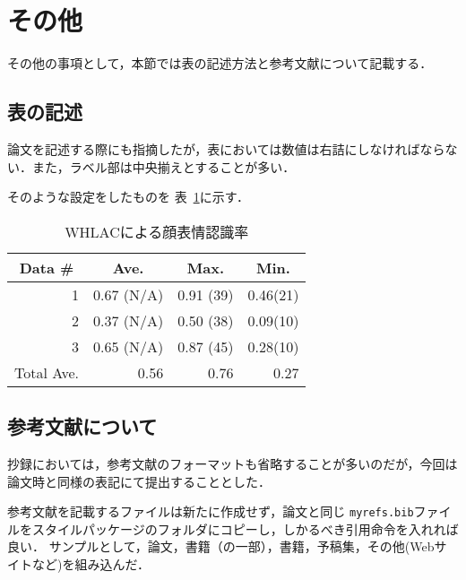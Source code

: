 \section{その他}
その他の事項として，本節では表の記述方法と参考文献について記載する．

\subsection{表の記述}
論文を記述する際にも指摘したが，表においては数値は右詰にしなければならない．また，ラベル部は中央揃えとすることが多い．

そのような設定をしたものを 表~\ref{table:face_rec}に示す．

\begin{table}[b]
\centering
\caption{WHLACによる顔表情認識率}
\label{table:face_rec}
\vspace{2mm}
\small
\begin{tabular}{|r|r|r|r|} \hline
\multicolumn{1}{|c|}{Data \#} & \multicolumn{1}{c|}{Ave.} & \multicolumn{1}{c|}{Max.} & \multicolumn{1}{c|}{Min.} \\ \hline\hline
1 &  0.67 (N/A) & 0.91 (39) & 0.46(21) \\ \hline
2 & 0.37 (N/A) & 0.50 (38) & 0.09(10) \\ \hline
3 & 0.65 (N/A) & 0.87 (45) & 0.28(10) \\ \hline\hline
\multicolumn{1}{|c|}{Total Ave.} & 0.56 & 0.76 & 0.27 \\ \hline
\end{tabular}
\end{table} %

\subsection{参考文献について}
抄録においては，参考文献のフォーマットも省略することが多いのだが，今回は論文時と同様の表記にて提出することとした．

参考文献を記載するファイルは新たに作成せず，論文と同じ \verb+myrefs.bib+ファイルをスタイルパッケージのフォルダにコピーし，しかるべき引用命令を入れれば良い．
サンプルとして，論文\cite{Kogami2009}，書籍（の一部）\cite{WelfareJapan}，書籍\cite{Nakata2010}，予稿集\cite{Miyaji2003ROMAN}，その他(Webサイトなど)\cite{HTUlatex}を組み込んだ．
